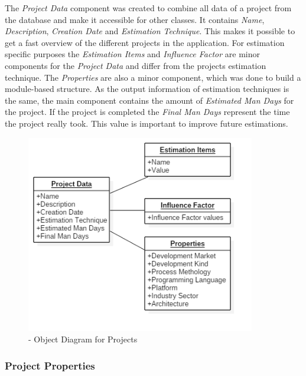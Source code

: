 The \textit{Project Data} component was created to combine all data of a project from the database and make it accessible for other classes. It contains \textit{Name}, \textit{Description}, \textit{Creation Date} and \textit{Estimation Technique}. This makes it possible to get a fast overview of the different projects in the application. For estimation specific purposes the \textit{Estimation Items} and \textit{Influence Factor} are minor components for the \textit{Project Data} and differ from the projects estimation technique. The \textit{Properties} are also a minor component, which was done to build a module-based structure. As the output information of estimation techniques is the same, the main component contains the amount of \textit{Estimated Man Days} for the project. If the project is completed the \textit{Final Man Days} represent the time the project really took. This value is important to improve future estimations.
\begin{figure}[h] 
	\centering 
	\includegraphics[width=10cm]{images/ObjectDiagramProject.png} 
	\caption{- Object Diagram for Projects} 
	\label{fig:objectDiagrammProject}
\end{figure}

\subsubsection{Project Properties}

